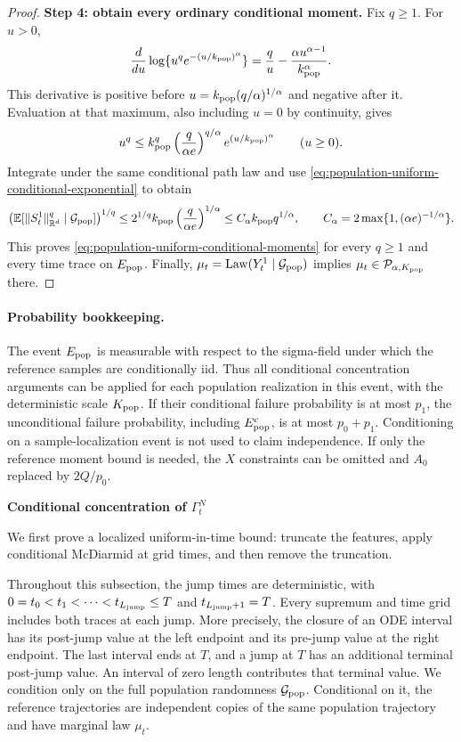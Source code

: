 \begin{proof}
\par\noindent\textbf{Step 4: obtain every ordinary conditional moment.}
Fix $q\ge1$. For $u>0$,
\[
 \frac d{du}\log\{u^qe^{-(u/k_{\rm pop})^\alpha}\}
 =\frac q u-\frac{\alpha u^{\alpha-1}}{k_{\rm pop}^\alpha}.
\]
This derivative is positive before
$u=k_{\rm pop}(q/\alpha)^{1/\alpha}$ and negative after it.
Evaluation at that maximum, also including $u=0$ by continuity, gives
\[
 u^q\le
 k_{\rm pop}^q\left(\frac q{\alpha e}\right)^{q/\alpha}
 e^{(u/k_{\rm pop})^\alpha}\qquad(u\ge0).
\]
Integrate under the same conditional path law and use
\eqref{eq:population-uniform-conditional-exponential} to obtain
\[
 \bigl(\mathbb E[\|S_t^1\|_{\mathbb R^d}^q\mid\mathcal G_{\rm pop}]\bigr)^{1/q}
 \le2^{1/q}k_{\rm pop}\left(\frac q{\alpha e}\right)^{1/\alpha}
 \le C_\alpha k_{\rm pop}q^{1/\alpha},
 \qquad
 C_\alpha=2\max\{1,(\alpha e)^{-1/\alpha}\}.
\]
This proves \eqref{eq:population-uniform-conditional-moments} for every
$q\ge1$ and every time trace on $E_{\rm pop}$.
Finally, $\mu_t=\operatorname{Law}(Y_t^1\mid\mathcal G_{\rm pop})$
implies $\mu_t\in\mathcal P_{\alpha,K_{\rm pop}}$ there.
\end{proof}

\paragraph{Probability bookkeeping.}
The event $E_{\rm pop}$ is measurable with respect to the sigma-field
under which the reference samples are conditionally iid. Thus all
conditional concentration arguments can be applied for each population
realization in this event, with the deterministic scale $K_{\rm pop}$.
If their conditional failure probability is at most $p_1$, the
unconditional failure probability, including $E_{\rm pop}^{\rm c}$, is
at most $p_0+p_1$. Conditioning on a sample-localization event is not
used to claim independence. If only the reference moment bound is
needed, the $X$ constraints can be omitted and $A_0$ replaced by $2Q/p_0$.

\noindent
\textbf{Conditional concentration of \(\Gamma_t^N\)}

We first prove a localized uniform-in-time bound: truncate the features, apply
conditional McDiarmid at grid times, and then remove the truncation.

Throughout this subsection, the jump times are deterministic, with
$0=t_0<t_1<\cdots<t_{L_{\mathrm{jump}}}\le T$ and $t_{L_{\mathrm{jump}}+1}=T$.
Every supremum and time grid includes both traces at each jump.
More precisely, the closure of an ODE interval has its post-jump value at
the left endpoint and its pre-jump value at the right endpoint.  The last
interval ends at $T$, and a jump at $T$ has an additional terminal post-jump
value.  An interval of zero length contributes that terminal value.
We condition only on the full population randomness $\mathcal G_{\rm pop}$.
Conditional on it, the reference trajectories are independent copies of
the same population trajectory and have marginal law $\mu_t$.

